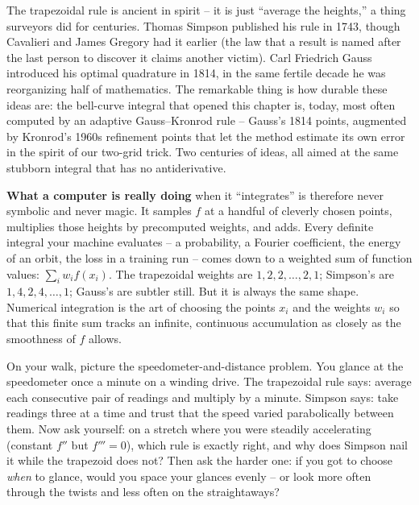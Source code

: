 \begin{historybox}
The trapezoidal rule is ancient in spirit -- it is just ``average the heights,'' a thing surveyors did for centuries. Thomas Simpson published his rule in 1743, though Cavalieri and James Gregory had it earlier (the law that a result is named after the last person to discover it claims another victim). Carl Friedrich Gauss introduced his optimal quadrature in 1814, in the same fertile decade he was reorganizing half of mathematics. The remarkable thing is how durable these ideas are: the bell-curve integral that opened this chapter is, today, most often computed by an adaptive Gauss--Kronrod rule -- Gauss's 1814 points, augmented by Kronrod's 1960s refinement points that let the method estimate its own error in the spirit of our two-grid trick. Two centuries of ideas, all aimed at the same stubborn integral that has no antiderivative.
\end{historybox}

\begin{happeningbox}
\textbf{What a computer is really doing} when it ``integrates'' is therefore never symbolic and never magic. It samples $f$ at a handful of cleverly chosen points, multiplies those heights by precomputed weights, and adds. Every definite integral your machine evaluates -- a probability, a Fourier coefficient, the energy of an orbit, the loss in a training run -- comes down to a weighted sum of function values: $\sum_i w_i f(x_i)$. The trapezoidal weights are $1,2,2,\dots,2,1$; Simpson's are $1,4,2,4,\dots,1$; Gauss's are subtler still. But it is always the same shape. Numerical integration is the art of choosing the points $x_i$ and the weights $w_i$ so that this finite sum tracks an infinite, continuous accumulation as closely as the smoothness of $f$ allows.
\end{happeningbox}

\begin{walkbox}
On your walk, picture the speedometer-and-distance problem. You glance at the speedometer once a minute on a winding drive. The trapezoidal rule says: average each consecutive pair of readings and multiply by a minute. Simpson says: take readings three at a time and trust that the speed varied parabolically between them. Now ask yourself: on a stretch where you were steadily accelerating (constant $f''$ but $f''' = 0$), which rule is exactly right, and why does Simpson nail it while the trapezoid does not? Then ask the harder one: if you got to choose \emph{when} to glance, would you space your glances evenly -- or look more often through the twists and less often on the straightaways?
\end{walkbox}


